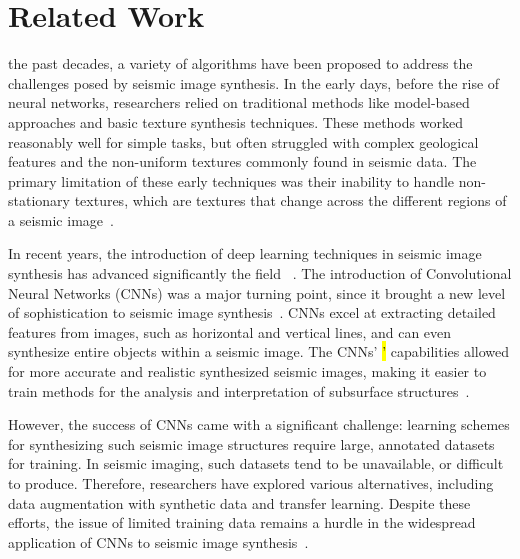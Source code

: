\documentclass{ieeeaccess}
\makeatletter
\DeclareRobustCommand{\DIFaddbegin}{\DIFOaddbegin \let\includegraphics\DIFaddincludegraphics} %
\DeclareRobustCommand{\DIFaddend}{\DIFOaddend \let\includegraphics\DIFOincludegraphics} %
\DeclareRobustCommand{\DIFdelbegin}{\DIFOdelbegin \let\includegraphics\DIFdelincludegraphics} %
\DeclareRobustCommand{\DIFdelend}{\DIFOaddend \let\includegraphics\DIFOincludegraphics} %
\let\sout@orig\sout %
\renewcommand{\sout}[1]{\ifmmode\text{\sout@orig{\ensuremath{#1}}}\else\sout@orig{#1}\fi} %
\providecommand{\DIFadd}[1]{{\protect\color{blue}#1}}
\providecommand{\DIFdel}[1]{{\protect\color{red}\sout{#1}}}
\renewcommand{\DIFadd}[1]{\ifmmode#1\else\begingroup\let\protect\relax\hl{#1}\endgroup\fi}
\renewcommand{\DIFdel}[1]{}
\providecommand{\DIFaddbegin}{}
\providecommand{\DIFaddend}{}
\providecommand{\DIFdelbegin}{}
\providecommand{\DIFdelend}{}
\renewcommand{\DIFaddbegin}{}
\renewcommand{\DIFaddend}{}
\renewcommand{\DIFdelbegin}{}
\renewcommand{\DIFdelend}{}
\makeatother
\begin{document}
\section{Related Work}
\label{sec:related}

 the past decades, a variety of algorithms have been proposed to address the challenges posed by seismic image synthesis. In the early days, before the rise of neural networks, researchers relied on traditional methods like model-based approaches and basic texture synthesis techniques. These methods worked reasonably well for simple tasks,  but often struggled with complex geological features and the non-uniform textures commonly found in seismic data. The primary limitation of these early techniques was their inability to handle non-stationary textures, which are textures that change across the different regions of a seismic image~\cite{Zhou2018}.

In recent years, the introduction of deep learning techniques in seismic image synthesis has advanced significantly the field \DIFdelbegin \DIFdel{of seismic image synthesis}\DIFdelend ~\cite{Zeng2019}. The introduction of Convolutional Neural Networks (CNNs) was a major turning point, since it brought a new level of sophistication to seismic image synthesis~\cite{Powers2011}. CNNs excel at extracting detailed features from images, such as horizontal and vertical lines, and can even synthesize entire objects within a seismic image. The CNNs\DIFaddbegin \DIFadd{' }\DIFaddend capabilities allowed for more accurate and realistic synthesized seismic images, making it easier to train methods for the analysis and interpretation of subsurface structures~\cite{Powers2011}. 

However, the success of CNNs came with a significant challenge: learning schemes for synthesizing such seismic image structures require large, annotated datasets for training. In seismic imaging, such datasets tend to be unavailable, or difficult to produce. Therefore, researchers have explored various alternatives, including data augmentation with synthetic data and transfer learning. Despite these efforts, the issue of limited training data remains a hurdle in the widespread application of CNNs to seismic image synthesis~\cite{Wang2021}.
\end{document}
